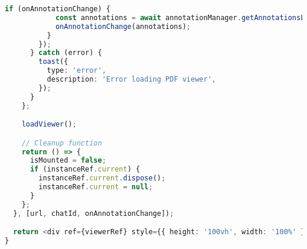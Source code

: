 \begin{lstlisting}[language=TypeScript, caption={Fitur anotasi PDF}]
          if (onAnnotationChange) {
            const annotations = await annotationManager.getAnnotationsList();
            onAnnotationChange(annotations);
          }
        });
      } catch (error) {
        toast({
          type: 'error',
          description: 'Error loading PDF viewer',
        });
      }
    };

    loadViewer();

    // Cleanup function
    return () => {
      isMounted = false;
      if (instanceRef.current) {
        instanceRef.current.dispose();
        instanceRef.current = null;
      }
    };
  }, [url, chatId, onAnnotationChange]);

  return <div ref={viewerRef} style={{ height: '100vh', width: '100%' }} />;
}
\end{lstlisting}